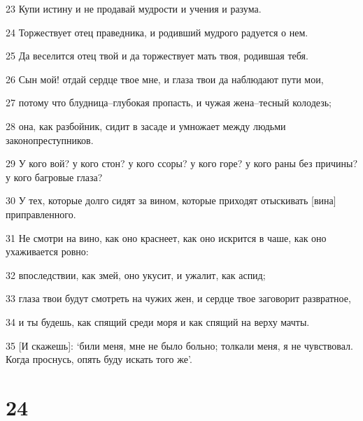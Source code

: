 \par 23 Купи истину и не продавай мудрости и учения и разума.
\par 24 Торжествует отец праведника, и родивший мудрого радуется о нем.
\par 25 Да веселится отец твой и да торжествует мать твоя, родившая тебя.
\par 26 Сын мой! отдай сердце твое мне, и глаза твои да наблюдают пути мои,
\par 27 потому что блудница--глубокая пропасть, и чужая жена--тесный колодезь;
\par 28 она, как разбойник, сидит в засаде и умножает между людьми законопреступников.
\par 29 У кого вой? у кого стон? у кого ссоры? у кого горе? у кого раны без причины? у кого багровые глаза?
\par 30 У тех, которые долго сидят за вином, которые приходят отыскивать [вина] приправленного.
\par 31 Не смотри на вино, как оно краснеет, как оно искрится в чаше, как оно ухаживается ровно:
\par 32 впоследствии, как змей, оно укусит, и ужалит, как аспид;
\par 33 глаза твои будут смотреть на чужих жен, и сердце твое заговорит развратное,
\par 34 и ты будешь, как спящий среди моря и как спящий на верху мачты.
\par 35 [И скажешь]: `били меня, мне не было больно; толкали меня, я не чувствовал. Когда проснусь, опять буду искать того же'.

\chapter{24}

